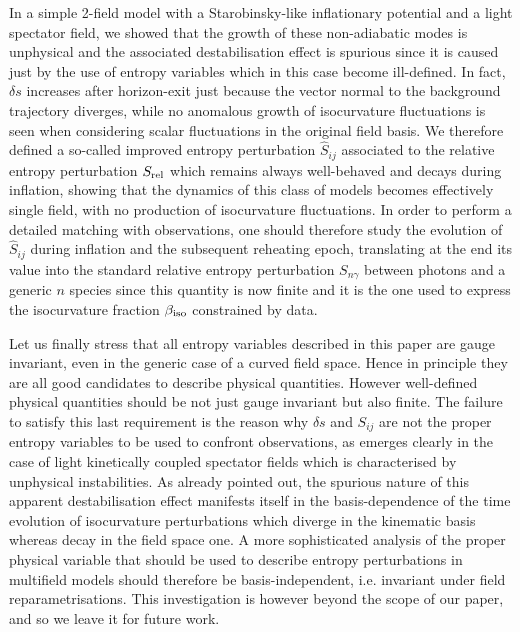 \documentclass[a4paper,11pt]{article}
\begin{document}
In a simple 2-field model with a Starobinsky-like inflationary potential and a light spectator field, we showed that the growth of these non-adiabatic modes is unphysical and the associated destabilisation effect is spurious since it is caused just by the use of entropy variables which in this case become ill-defined. In fact, $\delta s$ increases after horizon-exit just because the vector normal to the background trajectory diverges, while no anomalous growth of isocurvature fluctuations is seen when considering scalar fluctuations in the original field basis. We therefore defined a so-called improved entropy perturbation $\hat{S}_{ij}$ associated to the relative entropy perturbation $S_{\rm rel}$ which remains always well-behaved and decays during inflation, showing that the dynamics of this class of models becomes effectively single field, with no production of isocurvature fluctuations. In order to perform a detailed matching with observations, one should therefore study the evolution of $\hat{S}_{ij}$ during inflation and the subsequent reheating epoch, translating at the end its value into the standard relative entropy perturbation $S_{n\gamma}$ between photons and a generic $n$ species since this quantity is now finite and it is the one used to express the isocurvature fraction $\beta_{\rm iso}$ constrained by data.

Let us finally stress that all entropy variables described in this paper are gauge invariant, even in the generic case of a curved field space. Hence in principle they are all good candidates to describe physical quantities. However well-defined physical quantities should be not just gauge invariant but also finite. The failure to satisfy this last requirement is the reason why $\delta s$ and $S_{ij}$ are not the proper entropy variables to be used to confront observations, as emerges clearly in the case of light kinetically coupled spectator fields which is characterised by unphysical instabilities. As already pointed out, the spurious nature of this apparent destabilisation effect manifests itself in the basis-dependence of the time evolution of isocurvature perturbations which diverge in the kinematic basis whereas decay in the field space one. A more sophisticated analysis of the proper physical variable that should be used to describe entropy perturbations in multifield models should therefore be basis-independent, i.e. invariant under field reparametrisations. This investigation is however beyond the scope of our paper, and so we leave it for future work.
\end{document}
